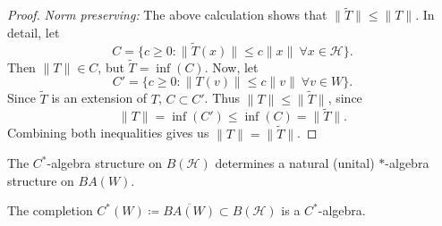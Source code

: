 \documentclass[12pt]{article}
\begin{document}
\begin{proof}
	\textit{Norm preserving:} The above calculation shows that $\|\tilde{T}\|\leq \|T\|$. In detail, let 
	\begin{equation*}
		C=\{c\geq 0 : \|\tilde{T}(x)\|\leq c\|x\| \ \forall x\in\mathcal{H}\}.
	\end{equation*} 
	Then $\|T\|\in C$, but $\tilde{T}=\inf(C)$. Now, let 
	\begin{equation*}
		C'=\{c\geq 0 : \|T(v)\|\leq c\|v\| \ \forall v\in W\}.
	\end{equation*}
	Since $\tilde{T}$ is an extension of $T$, $C\subset C'$. Thus $\|T\|\leq \|\tilde{T}\|$, since 
	\begin{equation*}
		\|T\|=\inf(C')\leq \inf(C) = \|\tilde{T}\|.
	\end{equation*}
	Combining both inequalities gives us $\|T\|=\|\tilde{T}\|$.
\end{proof}

\begin{corollary}
	The $C^\ast$-algebra structure on $B(\mathcal{H})$ determines a natural (unital) $\ast$-algebra structure on $BA(W)$.
\end{corollary}

\begin{corollary}
	The completion $C^\ast(W)\coloneqq \overline{BA(W)}\subset B(\mathcal{H})$ is a $C^\ast$-algebra.
\end{corollary}
\end{document}
